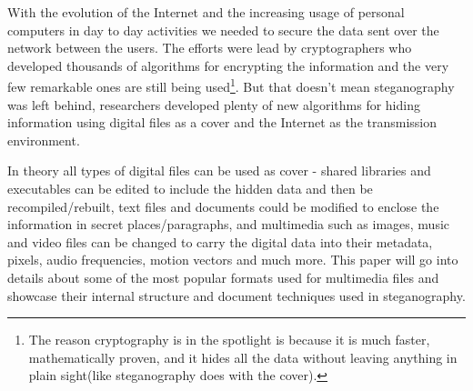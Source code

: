 \begin{multicols*}{2}

With the evolution of the Internet and the increasing usage of personal computers in day to day activities we needed to secure the data sent over the network between the users. The efforts were lead by cryptographers who developed thousands of algorithms for encrypting the information and the very few remarkable ones are still being used\footnote{The reason cryptography is in the spotlight is because it is much faster, mathematically proven, and it hides all the data without leaving anything in plain sight(like steganography does with the cover).}.  But that doesn't mean steganography was left behind, researchers developed plenty of new algorithms for hiding information using digital files as a cover and the Internet as the transmission environment.

In theory all types of digital files can be used as cover  - shared libraries and executables can be edited to include the hidden data and then be recompiled/rebuilt, text files and documents could be modified to enclose the information in secret places/paragraphs, and multimedia such as images, music and video files can be changed to carry the digital data into their metadata, pixels, audio frequencies, motion vectors and much more. This paper will go into details about some of the most popular formats used for multimedia files and showcase their internal structure and document techniques used in steganography.
\end{multicols*}



